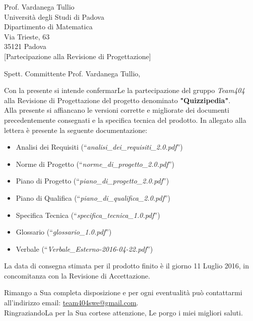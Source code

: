 \documentclass[boldsubject,shortindent,a4paper,11pt]{letteracdp}
\date{16 Maggio 2016}
\begin{document}
\begin{letter}{	Prof. Vardanega Tullio \\
				Universit\`a degli Studi di Padova \\
				Dipartimento di Matematica \\
				Via Trieste, 63 \\
				35121 Padova\\
				}
[Partecipazione alla Revisione di Progettazione]
\opening{Spett. Committente Prof. Vardanega Tullio,}
\noindent
Con la presente si intende confermarLe la partecipazione del gruppo \emph{Team404} alla Revisione di Progettazione del progetto denominato \textbf{"Quizzipedia"}.
\\
\noindent
Alla presente si affiancano le versioni corrette e migliorate dei documenti precedentemente consegnati e la specifica tecnica del prodotto.
\newline
\noindent
In allegato alla lettera è presente la seguente documentazione:
\begin{itemize}
	\item Analisi dei Requisiti (``\textit{analisi\_dei\_requisiti\_2.0.pdf}'')
	\item Norme di Progetto (``\textit{norme\_di\_progetto\_2.0.pdf}'')
	\item Piano di Progetto (``\textit{piano\_di\_progetto\_2.0.pdf}'')
	\item Piano di Qualifica (``\textit{piano\_di\_qualifica\_2.0.pdf}'')
	\item Specifica Tecnica (``\textit{specifica\_tecnica\_1.0.pdf}'')
	\item Glossario (``\textit{glossario\_1.0.pdf}'')
	\item Verbale (``\textit{Verbale\_Esterno-2016-04-22.pdf}'')
\end{itemize}

\noindent

La data di consegna stimata per il prodotto finito è il giorno 11 Luglio 2016, in concomitanza con la Revisione di Accettazione.

\closing{Rimango a Sua completa disposizione e per ogni eventualit\`a pu\`o contattarmi all'indirizzo email: \url{team404swe@gmail.com}.\\RingraziandoLa per la Sua cortese attenzione, Le porgo i miei migliori saluti.}
\end{letter}
\end{document}
